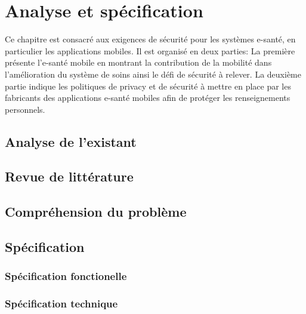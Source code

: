 \chapter{Analyse et spécification}

Ce chapitre est consacré aux exigences de sécurité pour les systèmes e-santé, en particulier les applications mobiles. Il est organisé en deux parties: La première présente l'e-santé mobile en montrant la contribution de la mobilité dans l'amélioration du système de soins ainsi le défi de sécurité à relever. La deuxième partie indique les politiques de privacy et de sécurité à mettre en place par les fabricants des applications e-santé mobiles afin de protéger les renseignements personnels.
\cleardoublepage

\section{Analyse de l’existant}
\section{Revue de littérature}
\section{Compréhension du problème}
\section{Spécification}
	\subsection{Spécification fonctionelle}
	\subsection{Spécification technique}